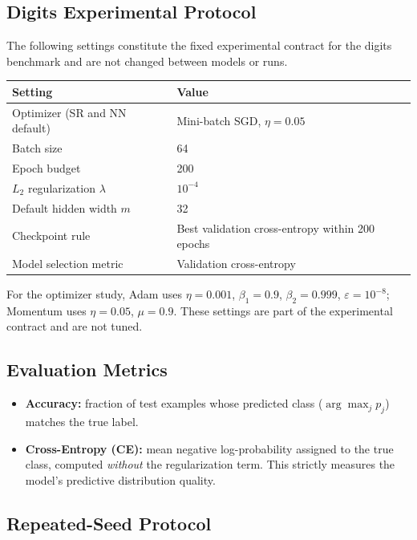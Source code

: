 \documentclass[11pt]{article}
\begin{document}
\subsection{Digits Experimental Protocol}

The following settings constitute the fixed experimental contract for the
digits benchmark and are not changed between models or runs.

\begin{center}
\begin{tabular}{ll}
\toprule
\textbf{Setting} & \textbf{Value} \\
\midrule
Optimizer (SR and NN default) & Mini-batch SGD, $\eta = 0.05$ \\
Batch size & 64 \\
Epoch budget & 200 \\
$L_2$ regularization $\lambda$ & $10^{-4}$ \\
Default hidden width $m$ & 32 \\
Checkpoint rule & Best validation cross-entropy within 200 epochs \\
Model selection metric & Validation cross-entropy \\
\bottomrule
\end{tabular}
\end{center}

For the optimizer study, Adam uses $\eta=0.001$, $\beta_1=0.9$, $\beta_2=0.999$,
$\varepsilon=10^{-8}$; Momentum uses $\eta=0.05$, $\mu=0.9$.
These settings are part of the experimental contract and are not tuned.

\subsection{Evaluation Metrics}

\begin{itemize}[leftmargin=*]
    \item \textbf{Accuracy:} fraction of test examples whose predicted class
          ($\arg\max_j p_j$) matches the true label.
    \item \textbf{Cross-Entropy (CE):} mean negative log-probability assigned to
          the true class, computed \emph{without} the regularization term.
          This strictly measures the model's predictive distribution quality.
\end{itemize}

\subsection{Repeated-Seed Protocol}
\end{document}
